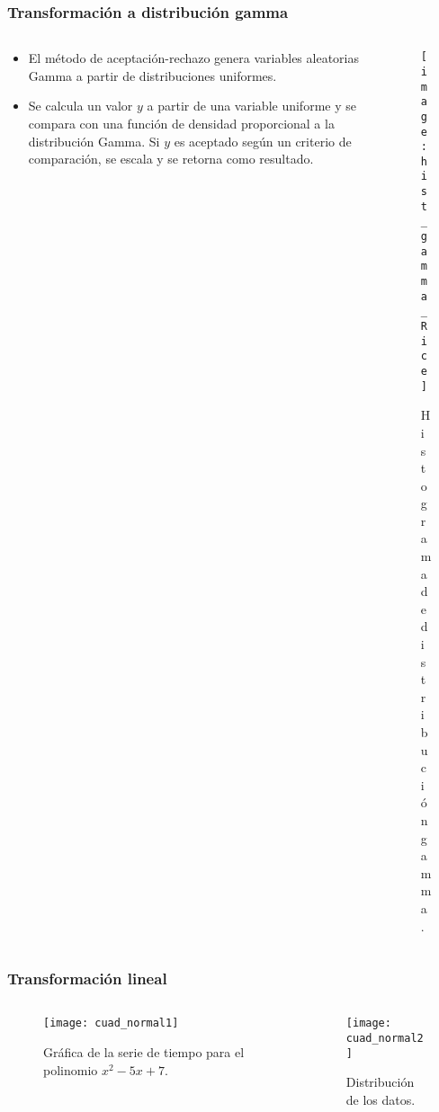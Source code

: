 \begin{frame}
	\frametitle{Transformación a distribución gamma}
	
	\begin{columns}
		\begin{column}{0.5\textwidth} %
			\begin{itemize}
				\item El método de aceptación-rechazo genera variables aleatorias Gamma a partir de distribuciones uniformes. 
				\item Se calcula un valor \(y\) a partir de una variable uniforme y se compara con una función de densidad proporcional a la distribución Gamma. Si \(y\) es aceptado según un criterio de comparación, se escala y se retorna como resultado.
			\end{itemize}
			
		\end{column}

	
	
	\begin{column}{0.5\textwidth} %
		\begin{figure}
			\centering
			\texttt{[image: hist\_gamma\_Rice]} %
			\caption{Histograma de distribución gamma.}
		\end{figure}
	\end{column}
	\end{columns}
\end{frame}


\begin{frame}
	\frametitle{Transformación lineal}
	
	\begin{columns}
		
		\begin{column}{0.5\textwidth} %
			\begin{figure}
				\centering
				\texttt{[image: cuad\_normal1]} %
				\caption{Gráfica de la serie de tiempo para el polinomio $x^2-5x+7$.}
			\end{figure}
		\end{column}
		
		\begin{column}{0.5\textwidth} %
			\begin{figure}
				\centering
				\texttt{[image: cuad\_normal2]} %
				\caption{Distribución de los datos.}
			\end{figure}
		\end{column}
	\end{columns}
\end{frame}


